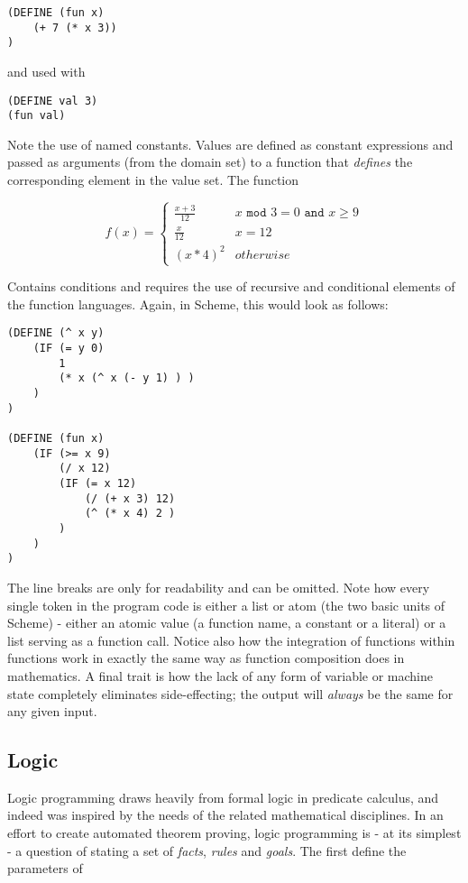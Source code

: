 \begin{lstlisting}
(DEFINE (fun x)
    (+ 7 (* x 3))
)
\end{lstlisting}

and used with 

\begin{lstlisting}
(DEFINE val 3)
(fun val)
\end{lstlisting}

Note the use of named constants. Values are defined as constant expressions and passed as arguments (from the domain set) to a function that \emph{defines} the corresponding element in the value set. The function

\[
f(x) =
\begin{cases} \frac{x+3}{12} & x \texttt{ mod } 3 = 0 \texttt{ and } x \geq 9
\\
\frac{x}{12} & x = 12
\\
(x * 4)^2 & otherwise
\end{cases}
\]

Contains conditions and requires the use of recursive and conditional elements of the function languages. Again, in Scheme, this would look as follows:

\begin{lstlisting}
(DEFINE (^ x y)
    (IF (= y 0)
        1
        (* x (^ x (- y 1) ) )
    )
)

(DEFINE (fun x)
    (IF (>= x 9)
        (/ x 12)
        (IF (= x 12)
            (/ (+ x 3) 12)
            (^ (* x 4) 2 )
        )
    )
)           
\end{lstlisting}

The line breaks are only for readability and can be omitted. Note how every single token in the program code is either a list or atom (the two basic units of Scheme) - either an atomic value (a function name, a constant or a literal) or a list serving as a function call. Notice also how the integration of functions within functions work in exactly the same way as function composition does in mathematics. A final trait is how the lack of any form of variable or machine state completely eliminates side-effecting; the output will \emph{always} be the same for any given input.

\subsection{Logic}
Logic programming draws heavily from formal logic in predicate calculus, and indeed was inspired by the needs of the related mathematical disciplines. In an effort to create automated theorem proving, logic programming is - at its simplest - a question of stating a set of \emph{facts}, \emph{rules} and \emph{goals}. The first define the parameters of 

